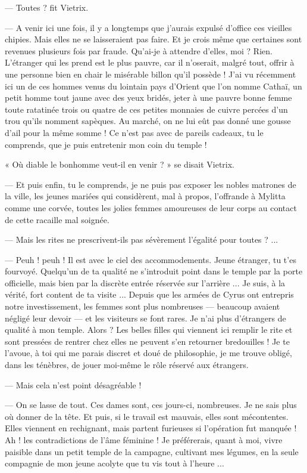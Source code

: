 \documentclass[a4paper, 11pt, oneside, polutonikogreek, french]{article}
\begin{document}
--- Toutes ? fit Vietrix.

--- A venir ici une fois, il y a longtemps que j'aurais expulsé d'office ces vieilles chipies. Mais elles ne se laisseraient pas faire. Et je crois même que certaines sont revenues plusieurs fois par fraude. Qu'ai-je à attendre d'elles, moi ? Rien. L'étranger qui les prend est le plus pauvre, car il n'oserait, malgré tout, offrir à une personne bien en chair le misérable billon qu'il possède ! J'ai vu récemment ici un de ces hommes venus du lointain pays d'Orient que l'on nomme Cathaï, un petit homme tout jaune avec des yeux bridés, jeter à une pauvre bonne femme toute ratatinée trois ou quatre de ces petites monnaies de cuivre percées d'un trou qu'ils nomment sapèques. Au marché, on ne lui eût pas donné une gousse d'ail pour la même somme ! Ce n'est pas avec de pareils cadeaux, tu le comprends, que je puis entretenir mon coin du temple !

« Où diable le bonhomme veut-il en venir ? » se disait Vietrix.

--- Et puis enfin, tu le comprends, je ne puis pas exposer les nobles matrones de la ville, les jeunes mariées qui considèrent, mal à propos, l'offrande à Mylitta comme une corvée, toutes les jolies femmes amoureuses de leur corps au contact de cette racaille mal soignée.

--- Mais les rites ne prescrivent-ils pas sévèrement l'égalité pour toutes ? ...

--- Peuh ! peuh ! Il est avec le ciel des accommodements. Jeune étranger, tu t'es fourvoyé. Quelqu'un de ta qualité ne s'introduit point dans le temple par la porte officielle, mais bien par la discrète entrée réservée sur l'arrière ... Je suis, à la vérité, fort content de ta visite ... Depuis que les armées de Cyrus ont entrepris notre investissement, les femmes sont plus nombreuses --- beaucoup avaient négligé leur devoir --- et les visiteurs se font rares. Je n'ai plus d'étrangers de qualité à mon temple. Alors ? Les belles filles qui viennent ici remplir le rite et sont pressées de rentrer chez elles ne peuvent s'en retourner bredouilles ! Je te l'avoue, à toi qui me parais discret et doué de philosophie, je me trouve obligé, dans les ténèbres, de jouer moi-même le rôle réservé aux étrangers.

--- Mais cela n'est point désagréable !

--- On se lasse de tout. Ces dames sont, ces jours-ci, nombreuses. Je ne sais plus où donner de la tête. Et puis, si le travail est mauvais, elles sont mécontentes. Elles viennent en rechignant, mais partent furieuses si l'opération fut manquée ! Ah ! les contradictions de l'âme féminine ! Je préférerais, quant à moi, vivre paisible dans un petit temple de la campagne, cultivant mes légumes, en la seule compagnie de mon jeune acolyte que tu vis tout à l'heure ...
\end{document}
